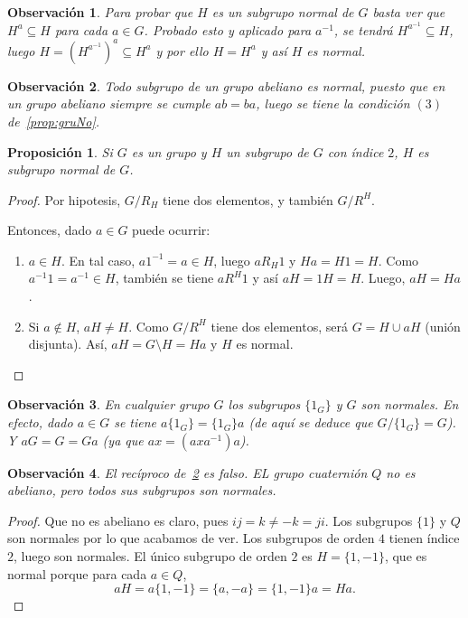 \documentclass[12pt]{article}
\newtheorem{proposition}[theorem]{Proposición}
\newtheorem{observation}{Observación}[theorem]
\begin{document}
\begin{observation}\label{ob:FacNo} Para probar que $H$ es un subgrupo normal de $G$ basta ver que $H^a \subseteq H$ para cada $a \in G$. Probado esto y aplicado para $a^{-1}$, se tendrá $H^{a^{-1}} \subseteq H$, luego $H = (H^{a^{-1}})^a \subseteq H^a$ y por ello $H = H^a$ y así $H$ es normal.
\end{observation}

\begin{observation}\label{ob:abNo} Todo subgrupo de un grupo abeliano es normal, puesto que en un grupo abeliano siempre se cumple $ab = ba$, luego se tiene la condición $(3)$ de~\ref{prop:gruNo}.
\end{observation}

\begin{proposition}Si $G$ es un grupo y $H$ un subgrupo de $G$ con índice $2$, $H$ es subgrupo normal de $G$.
\end{proposition}
\begin{proof}
Por hipotesis, $G/R_H$ tiene dos elementos, y también $G/R^H$. 

Entonces, dado $a \in G$ puede ocurrir: 
\begin{enumerate}
\item $a \in H$. En tal caso, $a1^{-1} = a \in H$, luego $aR_H 1$ y $Ha = H1 = H$. Como $a^{-1}1 = a^{-1} \in H$, también se tiene $aR^H1$ y así $aH = 1H = H$. Luego, $aH = Ha$.
\item Si $a \notin H$, $aH \neq H$. Como $G/R^H$ tiene dos elementos, será $G = H \cup aH$ (unión disjunta). Así, $aH = G\setminus H = Ha$ y $H$ es normal.
\end{enumerate}

\end{proof}

\begin{observation}En cualquier grupo $G$ los subgrupos $\lbrace 1_G \rbrace$ y $G$ son normales. En efecto, dado $a \in G$ se tiene $a \lbrace 1_G \rbrace = \lbrace 1_G \rbrace a$ (de aquí se deduce que $G/\lbrace 1_G \rbrace = G$). Y $aG = G = Ga$ (ya que $ax = (axa^{-1})a$).
\end{observation}

\begin{observation}El recíproco de~\ref{ob:abNo} es falso. EL grupo cuaternión $Q$ no es abeliano, pero todos sus subgrupos son normales.
\end{observation}
\begin{proof}
Que no es abeliano es claro, pues $ij = k \neq -k = ji$. Los subgrupos $\lbrace 1 \rbrace$ y $Q$ son normales por lo que acabamos de ver. Los subgrupos de orden $4$ tienen índice $2$, luego son normales. El único subgrupo de orden $2$ es $H = \lbrace 1, -1 \rbrace$, que es normal porque para cada $a \in Q$, $$aH = a\lbrace 1, -1 \rbrace = \lbrace a, -a \rbrace = \lbrace 1, -1 \rbrace a = Ha.$$

\end{proof}
\end{document}
